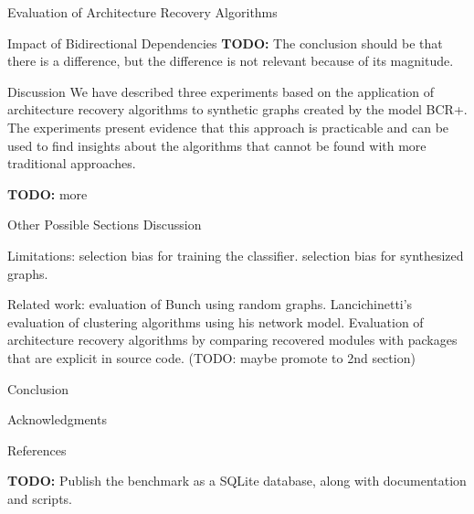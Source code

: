 \documentclass[11pt,twocolumn,a4paper,english]{article}
\newcommand{\TODO}{\textbf{TODO:} }
\begin{document}
\begin{section}{Evaluation of Architecture Recovery Algorithms}
\begin{subsection}{Impact of Bidirectional Dependencies}
	\TODO The conclusion should be that there is a difference, but the difference is not relevant because of its magnitude.
	
\end{subsection}

\begin{subsection}{Discussion}
	We have described three experiments based on the application of architecture recovery algorithms to synthetic graphs created by the model BCR+. The experiments present evidence that this approach is practicable and can be used to find insights about the algorithms that cannot be found with more traditional approaches.
	
	\TODO more
	
\end{subsection}

\end{section}


\begin{section}{Other Possible Sections}
	Discussion
	
	Limitations: selection bias for training the classifier. selection bias for synthesized graphs.
	
	Related work: evaluation of Bunch using random graphs. Lancichinetti's evaluation of clustering algorithms using his network model. Evaluation of architecture recovery algorithms by comparing recovered modules with packages that are explicit in source code. (TODO: maybe promote to 2nd section)
	
	Conclusion
	
	Acknowledgments
	
	References	
	
	\TODO Publish the benchmark as a SQLite database, along with documentation and scripts.
	
\end{section}




\end{document}
